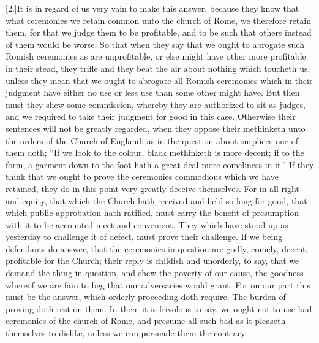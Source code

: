 [2.]It is in regard of us very vain to make this answer, because they know that what ceremonies we retain common unto the church of Rome, we therefore retain them, for that we judge them to be profitable, and to be such that others instead of them would be worse. So that when they say that we ought to abrogate such Romish ceremonies as are unprofitable, or else might have other more profitable in their stead, they trifle and they beat the air about nothing which toucheth us; unless they mean that we ought to abrogate all Romish ceremonies which in their judgment have either no use or less use than some other might have. But then must they shew some commission, whereby they are authorized to sit as judges, and we required to take their judgment for good in this case. Otherwise their sentences will not be greatly regarded, when they oppose their methinketh unto the orders of the Church of England: as in the question about surplices one of them doth; “If we look to the colour, black methinketh is more decent; if to the form, a garment down to the foot hath a great deal more comeliness in it.” If they think that we ought to prove the ceremonies commodious which we have retained, they do in this point very greatly deceive themselves. For in all right and equity, that which the Church hath received and held so long for good, that which public approbation hath ratified, must carry the benefit of presumption with it to be accounted meet and convenient. They which have stood up as yesterday to challenge it of defect, must prove their challenge. If we being defendants do answer, that the ceremonies in question are godly, comely, decent, profitable for the Church; their reply is childish and unorderly, to say, that we demand the thing in question, and shew the poverty  of our cause, the goodness whereof we are fain to beg that our adversaries would grant. For on our part this must be the answer, which orderly proceeding doth require. The burden of proving doth rest on them. In them it is frivolous to say, we ought not to use bad ceremonies of the church of Rome, and presume all such bad as it pleaseth themselves to dislike, unless we can persuade them the contrary.


